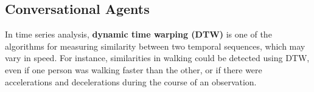 \documentclass[12pt]{article}
\begin{document}
\subsection{Conversational Agents}
\par In time series analysis, \textbf{dynamic time warping (DTW)} is one of the algorithms for measuring similarity between two temporal sequences, which may vary in speed. For instance, similarities in walking could be detected using DTW, even if one person was walking faster than the other, or if there were accelerations and decelerations during the course of an observation.
\end{document}
